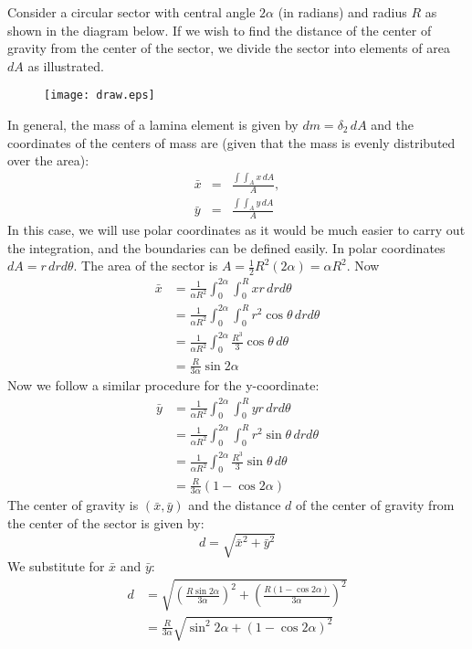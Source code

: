 \documentclass[12pt]{article}
\begin{document}
Consider a circular sector with central angle $2\alpha$ (in radians) and radius $R$ as shown in the diagram below. If we wish to find the distance of the center of gravity from the center of the sector, we divide the sector into elements of area $dA$ as illustrated.
\begin{figure}
\begin{center}
\texttt{[image: draw.eps]}
\end{center}
\end{figure}
In general, the mass of a lamina element is given by $dm=\delta_2\, dA$ and the coordinates of the centers of mass are (given that the mass is evenly distributed over the area):
\begin{eqnarray*}
\bar{x}&=&\frac{\int\!\!\int_A x\, dA}{A},\\
\bar{y}&=&\frac{\int\!\!\int_A y\, dA}{A}
\end{eqnarray*}
In this case, we will use polar coordinates as it would be much easier to carry out the integration, and the boundaries can be defined easily. In polar coordinates $dA=r\,drd\theta$. The area of the sector is $A=\frac{1}{2} R^2(2\alpha)=\alpha R^2$.
Now 
\begin{align*}
\bar{x}&=\frac{1}{\alpha R^2}\int_0^{2\alpha} \int_0^R x r\,drd\theta\\
       &=\frac{1}{\alpha R^2}\int_0^{2\alpha} \int_0^R r^2\cos\theta \,drd\theta\\
       &=\frac{1}{\alpha R^2}\int_0^{2\alpha} \frac{R^3}{3}\cos\theta \,d\theta\\
       &=\frac{R}{3\alpha}\sin2\alpha
\end{align*}
Now we follow a similar procedure for the y-coordinate:
\begin{align*}
\bar{y}&=\frac{1}{\alpha R^2}\int_0^{2\alpha} \int_0^R y r\,drd\theta\\
       &=\frac{1}{\alpha R^2}\int_0^{2\alpha} \int_0^R r^2\sin\theta \,drd\theta\\
       &=\frac{1}{\alpha R^2}\int_0^{2\alpha} \frac{R^3}{3}\sin\theta \,d\theta\\
       &=\frac{R}{3\alpha}(1-\cos2\alpha)
\end{align*}
The center of gravity is $(\bar{x},\bar{y})$ and the distance $d$ of the center of gravity from the center of the sector is given by:
$$d=\sqrt{\bar{x}^2 + \bar{y}^2}$$
We substitute for $\bar{x}$ and $\bar{y}$:
\begin{align*}
d&=\sqrt{\left(\frac{R\sin2\alpha}{3\alpha}\right)^2 + \left(\frac{R(1-\cos2\alpha)}{3\alpha}\right)^2}\\
 &=\frac{R}{3\alpha}\sqrt{\sin^{2}2\alpha + (1-\cos2\alpha)^2}
\end{align*}
\end{document}
